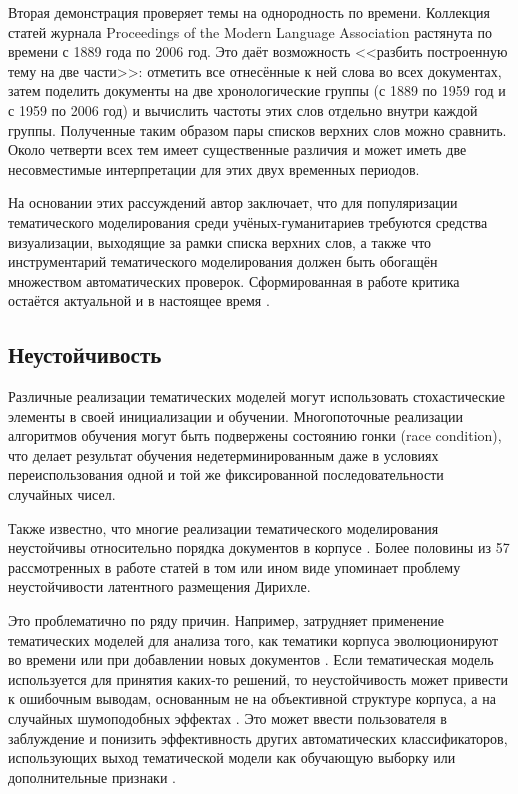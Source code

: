 Вторая демонстрация проверяет темы на однородность по времени. Коллекция статей журнала Proceedings of the Modern Language Association растянута по времени с 1889 года по 2006 год. Это даёт возможность <<разбить построенную тему на две части>>: отметить все отнесённые к ней слова во всех документах, затем поделить документы на две хронологические группы (с 1889 по 1959 год и с 1959 по 2006 год) и вычислить частоты этих слов отдельно внутри каждой группы. Полученные таким образом пары списков верхних слов можно сравнить. Около четверти всех тем имеет существенные различия и может иметь две несовместимые интерпретации для этих двух временных периодов.

На основании этих рассуждений автор заключает, что для популяризации тематического моделирования среди учёных-гуманитариев требуются средства визуализации, выходящие за рамки списка верхних слов, а также что инструментарий тематического моделирования должен быть обогащён множеством автоматических проверок. Сформированная в работе критика остаётся актуальной и в настоящее время \cite{paakkonen2020humanistic}.

\subsection{Неустойчивость}

Различные реализации тематических моделей могут использовать стохастические элементы в своей инициализации и обучении. Многопоточные реализации алгоритмов обучения могут быть подвержены состоянию гонки (race condition), что делает результат обучения недетерминированным даже в условиях переиспользования одной и той же фиксированной последовательности случайных чисел.

Также известно, что многие реализации тематического моделирования неустойчивы относительно порядка документов в корпусе \cite{agrawal2018wrong}. Более половины из 57 рассмотренных в работе \cite{agrawal2018wrong} статей в том или ином виде упоминает проблему неустойчивости латентного размещения Дирихле.

Это проблематично по ряду причин. Например, затрудняет применение тематических моделей для анализа того, как тематики корпуса эволюционируют во времени или при добавлении новых документов \cite{mehta_clustering_bank}. Если тематическая модель используется для принятия каких-то решений, то неустойчивость может привести к ошибочным выводам, основанным не на объективной структуре корпуса, а на случайных шумоподобных эффектах \cite{mantyla2018measuring}. Это может ввести пользователя в заблуждение и понизить эффективность других автоматических классификаторов, использующих выход тематической модели как обучающую выборку или дополнительные признаки \cite{agrawal2018wrong}.

